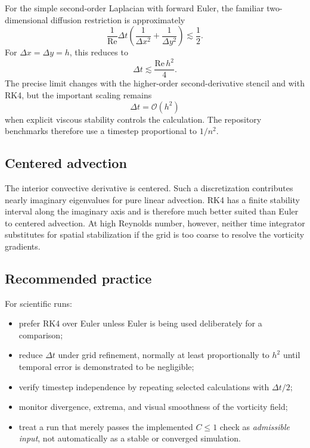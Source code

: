 \documentclass[11pt,a4paper]{article}
\newcommand{\Rey}{\mathrm{Re}}
\newcommand{\dt}{\Delta t}
\newcommand{\dx}{\Delta x}
\newcommand{\dy}{\Delta y}
\newcommand{\Oh}{\mathcal{O}}
\begin{document}
For the simple second-order Laplacian with forward Euler, the familiar two-dimensional diffusion restriction is approximately
\begin{equation}
\frac{1}{\Rey}\dt
\left(\frac{1}{\dx^2}+\frac{1}{\dy^2}\right)
\lesssim \frac{1}{2}.
\label{eq:diffusion-cfl}
\end{equation}
For $\dx=\dy=h$, this reduces to
\begin{equation}
\dt\lesssim \frac{\Rey\,h^2}{4}.
\end{equation}
The precise limit changes with the higher-order second-derivative stencil and with RK4, but the important scaling remains
\begin{equation}
\dt=\Oh(h^2)
\end{equation}
when explicit viscous stability controls the calculation.  The repository benchmarks therefore use a timestep proportional to $1/n^2$.

\subsection{Centered advection}

The interior convective derivative is centered.  Such a discretization contributes nearly imaginary eigenvalues for pure linear advection.  RK4 has a finite stability interval along the imaginary axis and is therefore much better suited than Euler to centered advection.  At high Reynolds number, however, neither time integrator substitutes for spatial stabilization if the grid is too coarse to resolve the vorticity gradients.

\subsection{Recommended practice}

For scientific runs:
\begin{itemize}[leftmargin=2em]
  \item prefer RK4 over Euler unless Euler is being used deliberately for a comparison;
  \item reduce $\dt$ under grid refinement, normally at least proportionally to $h^2$ until temporal error is demonstrated to be negligible;
  \item verify timestep independence by repeating selected calculations with $\dt/2$;
  \item monitor divergence, extrema, and visual smoothness of the vorticity field;
  \item treat a run that merely passes the implemented $C\le 1$ check as \emph{admissible input}, not automatically as a stable or converged simulation.
\end{itemize}
\end{document}
